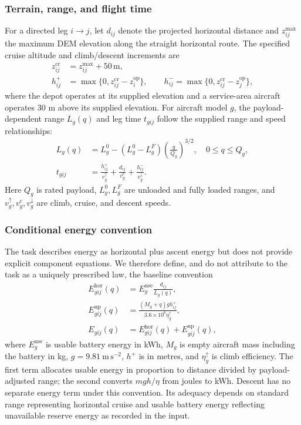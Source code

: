 \documentclass[11pt,a4paper]{article}
\newcommand{\Ehor}{E^{\mathrm{hor}}}
\newcommand{\Eup}{E^{\mathrm{up}}}
\newcommand{\m}{\,\mathrm{m}}
\begin{document}
\subsubsection{Terrain, range, and flight time}
For a directed leg $i\to j$, let $d_{ij}$ denote the projected horizontal distance and $z^{\max}_{ij}$ the maximum DEM elevation along the straight horizontal route. The specified cruise altitude and climb/descent increments are
\begin{align}
z^{\mathrm{cr}}_{ij}&=z^{\max}_{ij}+50\m,\\
h^+_{ij}&=\max\{0,z^{\mathrm{cr}}_{ij}-z_i^{\mathrm{op}}\},\qquad
h^-_{ij}=\max\{0,z^{\mathrm{cr}}_{ij}-z_j^{\mathrm{op}}\},
\end{align}
where the depot operates at its supplied elevation and a service-area aircraft operates 30 m above its supplied elevation. For aircraft model $g$, the payload-dependent range $L_g(q)$ and leg time $t_{gij}$ follow the supplied range and speed relationships:
\begin{align}
L_g(q)&=L_g^0-(L_g^0-L_g^F)\left(\frac{q}{Q_g}\right)^{3/2},\quad 0\le q\le Q_g,\label{eq:range}\\
t_{gij}&=\frac{h^+_{ij}}{v_g^\uparrow}+\frac{d_{ij}}{v_g^c}+\frac{h^-_{ij}}{v_g^\downarrow}.\label{eq:time}
\end{align}
Here $Q_g$ is rated payload, $L_g^0,L_g^F$ are unloaded and fully loaded ranges, and $v_g^\uparrow,v_g^c,v_g^\downarrow$ are climb, cruise, and descent speeds.

\subsubsection{Conditional energy convention}
The task describes energy as horizontal plus ascent energy but does not provide explicit component equations. We therefore define, and do not attribute to the task as a uniquely prescribed law, the baseline convention
\begin{align}
\Ehor_{gij}(q)&=E_g^{\mathrm{use}}\frac{d_{ij}}{L_g(q)},\\
\Eup_{gij}(q)&=\frac{(M_g+q)g h^+_{ij}}{3.6\times10^6\eta_g^\uparrow},\\
E_{gij}(q)&=\Ehor_{gij}(q)+\Eup_{gij}(q),
\label{eq:energy}
\end{align}
where $E_g^{\mathrm{use}}$ is usable battery energy in kWh, $M_g$ is empty aircraft mass including the battery in kg, $g=9.81\ \mathrm{m\,s^{-2}}$, $h^+$ is in metres, and $\eta_g^\uparrow$ is climb efficiency. The first term allocates usable energy in proportion to distance divided by payload-adjusted range; the second converts $mgh/\eta$ from joules to kWh. Descent has no separate energy term under this convention. Its adequacy depends on standard range representing horizontal cruise and usable battery energy reflecting unavailable reserve energy as recorded in the input.
\end{document}
